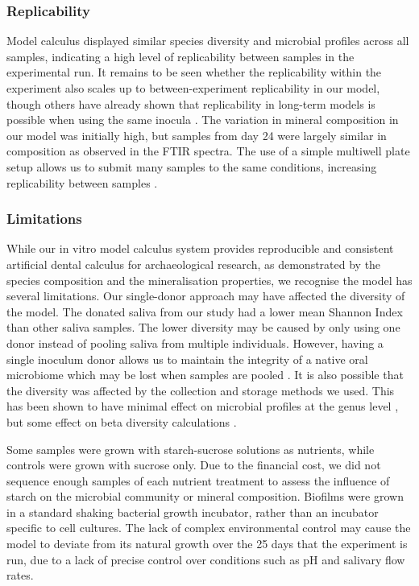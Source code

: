 \documentclass[10pt,a4paper]{article}
\begin{document}
\subsubsection*{Replicability}\label{replicability}

Model calculus displayed similar species diversity and microbial
profiles across all samples, indicating a high level of replicability
between samples in the experimental run. It remains to be seen whether
the replicability within the experiment also scales up to
between-experiment replicability in our model, though others have
already shown that replicability in long-term models is possible when
using the same inocula \citep{velskoConsistentReproducible2018}. The
variation in mineral composition in our model was initially high, but
samples from day 24 were largely similar in composition as observed in
the FTIR spectra. The use of a simple multiwell plate setup allows us to
submit many samples to the same conditions, increasing replicability
between samples \citep{extercateAAA2010}.

\subsubsection*{Limitations}\label{limitations}

While our in vitro model calculus system provides reproducible and
consistent artificial dental calculus for archaeological research, as
demonstrated by the species composition and the mineralisation
properties, we recognise the model has several limitations. Our
single-donor approach may have affected the diversity of the model. The
donated saliva from our study had a lower mean Shannon Index than other
saliva samples. The lower diversity may be caused by only using one
donor instead of pooling saliva from multiple individuals. However,
having a single inoculum donor allows us to maintain the integrity of a
native oral microbiome which may be lost when samples are pooled
\citep{edlundBiofilmModel2013}. It is also possible that the diversity
was affected by the collection and storage methods we used. This has
been shown to have minimal effect on microbial profiles at the genus
level \citep{limSalivaMicrobiome2017}, but some effect on beta diversity
calculations \citep{omoriComparativeEvaluation2021}.

Some samples were grown with starch-sucrose solutions as nutrients,
while controls were grown with sucrose only. Due to the financial cost,
we did not sequence enough samples of each nutrient treatment to assess
the influence of starch on the microbial community or mineral
composition. Biofilms were grown in a standard shaking bacterial growth
incubator, rather than an incubator specific to cell cultures. The lack
of complex environmental control may cause the model to deviate from its
natural growth over the 25 days that the experiment is run, due to a
lack of precise control over conditions such as pH and salivary flow
rates.
\end{document}
